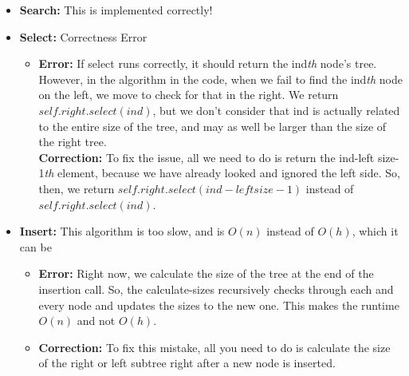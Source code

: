 \documentclass[11pt]{article}
\begin{document}
\begin{enumerate}
\begin{enumerate}
        \begin{itemize}
            \item \textbf{Search:} This is implemented correctly!
            \item \textbf{Select:} Correctness Error
            \begin{itemize}
                \item \textbf{Error:} If select runs correctly, it should return the ind\textit{th} node's tree. However, in the algorithm in the code, when we fail to find the ind\textit{th} node on the left, we move to check for that in the right. We return $self.right.select(ind)$, but we don't consider that ind is actually related to the entire size of the tree, and may as well be larger than the size of the right tree. 
                \\ \textbf{Correction:} To fix the issue, all we need to do is return the ind-left size-1\textit{th} element, because we have already looked and ignored the left side. So, then, we return $self.right.select(ind-left size-1)$ instead of $self.right.select(ind)$.
            \end{itemize}
            \item \textbf{Insert:} This algorithm is too slow, and is $O(n)$ instead of $O(h)$, which it can be
            \begin{itemize}
                \item \textbf{Error:} Right now, we calculate the size of the tree at the end of the insertion call. So, the calculate-sizes recursively checks through each and every node and updates the sizes to the new one. This makes the runtime $O(n)$ and not $O(h)$.
                \item \textbf{Correction:} To fix this mistake, all you need to do is calculate the size of the right or left subtree right after a new node is inserted.
            \end{itemize}
        \end{itemize}
        

\end{enumerate}
\end{enumerate}
\end{document}
